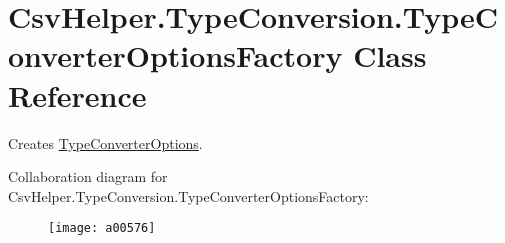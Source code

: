 \hypertarget{a00179}{\section{Csv\-Helper.\-Type\-Conversion.\-Type\-Converter\-Options\-Factory Class Reference}
\label{a00179}
}


Creates \hyperlink{a00178}{Type\-Converter\-Options}.  




Collaboration diagram for Csv\-Helper.\-Type\-Conversion.\-Type\-Converter\-Options\-Factory\-:
\nopagebreak
\begin{figure}[H]
\begin{center}
\leavevmode
\texttt{[image: a00576]}
\end{center}
\end{figure}
